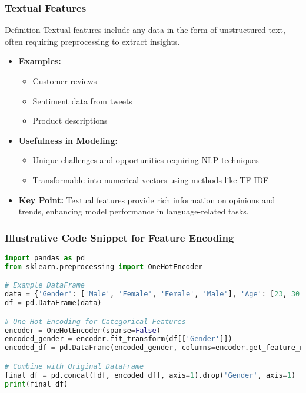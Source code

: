 \documentclass[aspectratio=169]{beamer}
\begin{document}
\begin{frame}
    \frametitle{Textual Features}
    \begin{block}{Definition}
        Textual features include any data in the form of unstructured text, often requiring preprocessing to extract insights.
    \end{block}
    \begin{itemize}
        \item \textbf{Examples:}
            \begin{itemize}
                \item Customer reviews
                \item Sentiment data from tweets
                \item Product descriptions
            \end{itemize}
        \item \textbf{Usefulness in Modeling:}
            \begin{itemize}
                \item Unique challenges and opportunities requiring NLP techniques
                \item Transformable into numerical vectors using methods like TF-IDF
            \end{itemize}
        \item \textbf{Key Point:}
            Textual features provide rich information on opinions and trends, enhancing model performance in language-related tasks.
    \end{itemize}
\end{frame}

\begin{frame}[fragile]
    \frametitle{Illustrative Code Snippet for Feature Encoding}
    \begin{lstlisting}[language=Python]
import pandas as pd
from sklearn.preprocessing import OneHotEncoder

# Example DataFrame
data = {'Gender': ['Male', 'Female', 'Female', 'Male'], 'Age': [23, 30, 22, 35]}
df = pd.DataFrame(data)

# One-Hot Encoding for Categorical Features
encoder = OneHotEncoder(sparse=False)
encoded_gender = encoder.fit_transform(df[['Gender']])
encoded_df = pd.DataFrame(encoded_gender, columns=encoder.get_feature_names(['Gender']))

# Combine with Original DataFrame
final_df = pd.concat([df, encoded_df], axis=1).drop('Gender', axis=1)
print(final_df)
    \end{lstlisting}
\end{frame}
\end{document}

